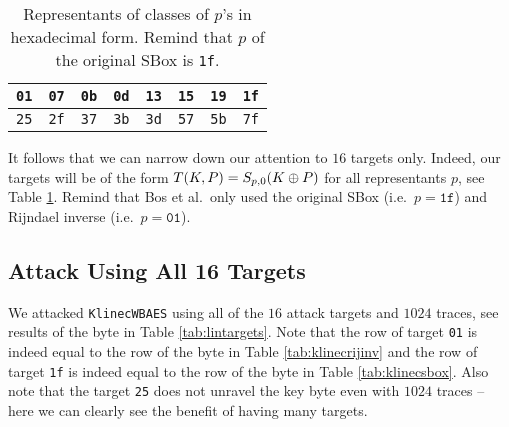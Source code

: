 \begin{table}[h]
	\begin{center}
	\begin{tabular}{| c | c | c | c | c | c | c | c |}
		\hline
		{\tt 01} & {\tt 07} & {\tt 0b} & {\tt 0d} & {\tt 13} & {\tt 15} & {\tt 19} & {\tt 1f} \\
		\hline
		{\tt 25} & {\tt 2f} & {\tt 37} & {\tt 3b} & {\tt 3d} & {\tt 57} & {\tt 5b} & {\tt 7f} \\
		\hline
	\end{tabular}
	\end{center}
\caption{Representants of classes of $p$'s in hexadecimal form. Remind that $p$ of the original SBox is {\tt 1f}.}
\label{tab:classrepre}
\end{table}

It follows that we can narrow down our attention to $16$ targets only. Indeed, our targets will be of the form $T(K,P) = S_{p,0}(K\oplus P)$ for all representants $p$, see Table \ref{tab:classrepre}. Remind that Bos et al.\ only used the original SBox (i.e.\ $p = \texttt{1f}$) and Rijndael inverse (i.e.\ $p = \texttt{01}$).



\subsection{Attack Using All 16 Targets}

We attacked {\tt KlinecWBAES} using all of the $16$ attack targets and $1024$ traces, see results of the  byte in Table \ref{tab:lintargets}. Note that the row of target {\tt 01} is indeed equal to the row of the  byte in Table \ref{tab:klinecrijinv} and the row of target {\tt 1f} is indeed equal to the row of the  byte in Table \ref{tab:klinecsbox}. Also note that the target {\tt 25} does not unravel the  key byte even with $1024$ traces -- here we can clearly see the benefit of having many targets.



